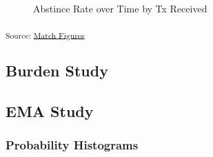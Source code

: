 \documentclass[
  letterpaper,
  DIV=11,
  numbers=noendperiod]{scrartcl}
\begin{document}
\begin{figure}[H]


\caption{\label{fig-tx_week_5}Abstince Rate over Time by Tx Received}

\end{figure}%

\textsubscript{Source:
\href{https://jjcurtin.github.io/lectures_science/notebooks/match_figs-preview.html\#cell-fig-tx_week_5}{Match
Figures}}

\subsection{Burden Study}\label{burden-study}

\subsection{EMA Study}\label{ema-study}

\subsubsection{Probability Histograms}\label{probability-histograms}
\end{document}
